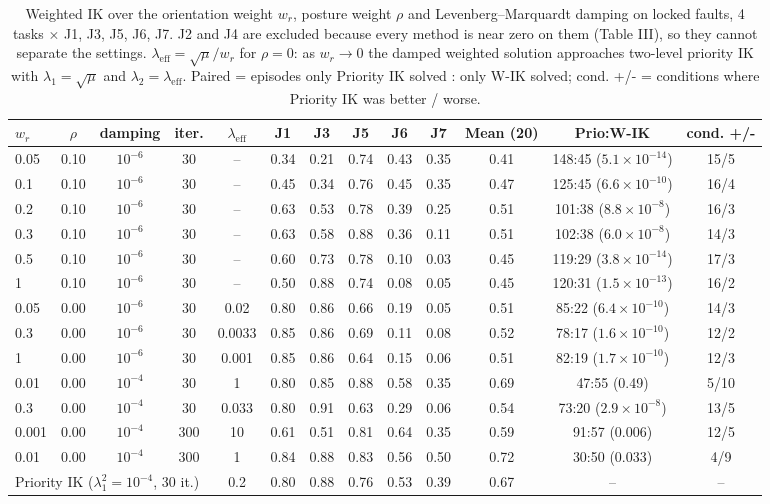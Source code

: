 \begin{table}[t]
\centering
\caption{Weighted IK over the orientation weight $w_r$, posture weight $\rho$ and Levenberg--Marquardt damping on locked faults, 4 tasks $\times$ J1, J3, J5, J6, J7. J2 and J4 are excluded because every method is near zero on them (Table III), so they cannot separate the settings. $\lambda_{\mathrm{eff}} = \sqrt{\mu}/w_r$ for $\rho = 0$: as $w_r \to 0$ the damped weighted solution approaches two-level priority IK with $\lambda_1 = \sqrt{\mu}$ and $\lambda_2 = \lambda_{\mathrm{eff}}$. Paired = episodes only Priority IK solved : only W-IK solved; cond. +/- = conditions where Priority IK was better / worse.}
\label{tab:wik_sweep}
\setlength{\tabcolsep}{3pt}
\begin{tabular}{lcccccccccccc}
\toprule
$w_r$ & $\rho$ & damping & iter. & $\lambda_{\mathrm{eff}}$ & J1 & J3 & J5 & J6 & J7 & Mean (20) & Prio:W-IK & cond. +/- \\
\midrule
0.05 & 0.10 & $10^{-6}$ & 30 & -- & 0.34 & 0.21 & 0.74 & 0.43 & 0.35 & 0.41 & 148:45 ($5.1\times10^{-14}$) & 15/5 \\
0.1 & 0.10 & $10^{-6}$ & 30 & -- & 0.45 & 0.34 & 0.76 & 0.45 & 0.35 & 0.47 & 125:45 ($6.6\times10^{-10}$) & 16/4 \\
0.2 & 0.10 & $10^{-6}$ & 30 & -- & 0.63 & 0.53 & 0.78 & 0.39 & 0.25 & 0.51 & 101:38 ($8.8\times10^{-8}$) & 16/3 \\
0.3 & 0.10 & $10^{-6}$ & 30 & -- & 0.63 & 0.58 & 0.88 & 0.36 & 0.11 & 0.51 & 102:38 ($6.0\times10^{-8}$) & 14/3 \\
0.5 & 0.10 & $10^{-6}$ & 30 & -- & 0.60 & 0.73 & 0.78 & 0.10 & 0.03 & 0.45 & 119:29 ($3.8\times10^{-14}$) & 17/3 \\
1 & 0.10 & $10^{-6}$ & 30 & -- & 0.50 & 0.88 & 0.74 & 0.08 & 0.05 & 0.45 & 120:31 ($1.5\times10^{-13}$) & 16/2 \\
0.05 & 0.00 & $10^{-6}$ & 30 & 0.02 & 0.80 & 0.86 & 0.66 & 0.19 & 0.05 & 0.51 & 85:22 ($6.4\times10^{-10}$) & 14/3 \\
0.3 & 0.00 & $10^{-6}$ & 30 & 0.0033 & 0.85 & 0.86 & 0.69 & 0.11 & 0.08 & 0.52 & 78:17 ($1.6\times10^{-10}$) & 12/2 \\
1 & 0.00 & $10^{-6}$ & 30 & 0.001 & 0.85 & 0.86 & 0.64 & 0.15 & 0.06 & 0.51 & 82:19 ($1.7\times10^{-10}$) & 12/3 \\
0.01 & 0.00 & $10^{-4}$ & 30 & 1 & 0.80 & 0.85 & 0.88 & 0.58 & 0.35 & 0.69 & 47:55 (0.49) & 5/10 \\
0.3 & 0.00 & $10^{-4}$ & 30 & 0.033 & 0.80 & 0.91 & 0.63 & 0.29 & 0.06 & 0.54 & 73:20 ($2.9\times10^{-8}$) & 13/5 \\
0.001 & 0.00 & $10^{-4}$ & 300 & 10 & 0.61 & 0.51 & 0.81 & 0.64 & 0.35 & 0.59 & 91:57 (0.006) & 12/5 \\
0.01 & 0.00 & $10^{-4}$ & 300 & 1 & 0.84 & 0.88 & 0.83 & 0.56 & 0.50 & 0.72 & 30:50 (0.033) & 4/9 \\
\multicolumn{4}{l}{Priority IK ($\lambda_1^2{=}10^{-4}$, 30 it.)} & 0.2 & 0.80 & 0.88 & 0.76 & 0.53 & 0.39 & 0.67 & -- & -- \\
\bottomrule
\end{tabular}
\end{table}
